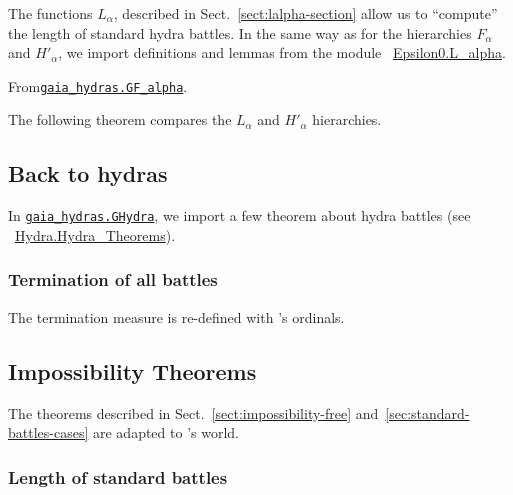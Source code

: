 The functions $L_\alpha$, described in Sect.~\vref{sect:lalpha-section}  allow us to ``compute'' the length of standard hydra battles. In the same way as for the hierarchies $F_\alpha$ and $H'_\alpha$, we import  definitions and lemmas from the module
~\href{../theories/html/hydras.Epsilon0.L_alpha.html}{Epsilon0.L\_alpha}.


\vspace{4pt}
\noindent
From\href{../theories/html/gaia_hydras.GF_alpha.html}%
{\texttt{gaia\_hydras.GF\_alpha}}.


The following theorem compares the $L_\alpha$ and $H'_\alpha$ hierarchies.


\subsection{Back to hydras}

In \href{../theories/html/gaia_hydras.GHydra.html}%
{\texttt{gaia\_hydras.GHydra}}, we import a few theorem about hydra battles (see
~\href{../theories/html/theories/html/hydras.Hydra.Hydra_Theorems.html}{Hydra.Hydra\_Theorems}).

\subsubsection{Termination of all battles}

The termination measure is re-defined with \gaia's ordinals.



\subsection{Impossibility Theorems}
\label{sect:impossibility-gaia-version}
The theorems described in Sect.~\vref{sect:impossibility-free}
and~\vref{sec:standard-battles-cases} are adapted to \gaia's world.







\subsubsection{Length of standard battles}
  
